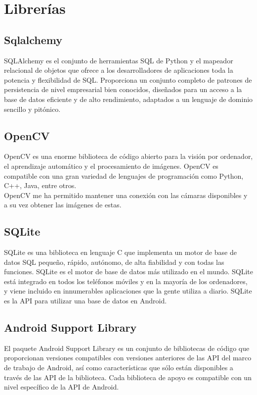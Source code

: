 \section{Librerías}

\subsection{Sqlalchemy}

SQLAlchemy es el conjunto de herramientas SQL de Python y el mapeador relacional de objetos que ofrece a los desarrolladores de aplicaciones toda la potencia y flexibilidad de SQL. Proporciona un conjunto completo de patrones de persistencia de nivel empresarial bien conocidos, diseñados para un acceso a la base de datos eficiente y de alto rendimiento, adaptados a un lenguaje de dominio sencillo y pitónico.

\subsection{OpenCV}

OpenCV es una enorme biblioteca de código abierto para la visión por ordenador, el aprendizaje automático y el procesamiento de imágenes. OpenCV es compatible con una gran variedad de lenguajes de programación como Python, C++, Java, entre otros.\\
OpenCV me ha permitido mantener una conexión con las cámaras disponibles y a su vez obtener las imágenes de estas.

\subsection{SQLite}

SQLite es una biblioteca en lenguaje C que implementa un motor de base de datos SQL pequeño, rápido, autónomo, de alta fiabilidad y con todas las funciones. SQLite es el motor de base de datos más utilizado en el mundo. SQLite está integrado en todos los teléfonos móviles y en la mayoría de los ordenadores, y viene incluido en innumerables aplicaciones que la gente utiliza a diario. SQLite es la API para utilizar una base de datos en Android.

\subsection{Android Support Library}

El paquete Android Support Library es un conjunto de bibliotecas de código que proporcionan versiones compatibles con versiones anteriores de las API del marco de trabajo de Android, así como características que sólo están disponibles a través de las API de la biblioteca. Cada biblioteca de apoyo es compatible con un nivel específico de la API de Android.

